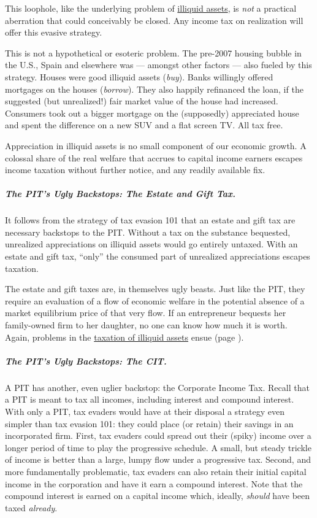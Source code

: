 This loophole, like the underlying problem of \hyperref[sec:TaxIlliquid]{illiquid assets}, is \emph{not} a practical aberration that could conceivably be closed. Any income tax on realization will offer this evasive strategy. 

This is not a hypothetical or esoteric problem. The pre-2007 housing bubble in the U.S., Spain and elsewhere was --- amongst other factors --- also fueled by this strategy. Houses were good illiquid assets (\emph{buy}). Banks willingly offered mortgages on the houses (\emph{borrow}). They also happily refinanced the loan, if the suggested (but unrealized!) fair market value of the house had increased. Consumers took out a bigger mortgage on the (supposedly) appreciated house and spent the difference on a new SUV and a flat screen TV. All tax free.

Appreciation in illiquid assets is no small component of our economic growth. A colossal share of the real welfare that accrues to capital income earners escapes income taxation without further notice, and any readily available fix.

\subparagraph{The PIT's Ugly Backstops: The Estate and Gift Tax.} It follows from the strategy of tax evasion 101 that an estate and gift tax are necessary backstops to the PIT. Without a tax on the substance bequested, unrealized appreciations on illiquid assets would go entirely untaxed. With an estate and gift tax, ``only'' the consumed part of unrealized appreciations escapes taxation.

The estate and gift taxes are, in themselves ugly beasts. Just like the PIT, they require an evaluation of a flow of economic welfare in the potential absence of a market equilibrium price of that very flow. If an entrepreneur bequests her family-owned firm to her daughter, no one can know how much it is worth. Again, problems in the \hyperref[sec:Illiquid]{taxation of illiquid assets} ensue (page \pageref{sec:Illiquid}). 

\subparagraph{The PIT's Ugly Backstops: The CIT.}  \label{sec:ScoreCIT} A PIT has another, even uglier backstop: the Corporate Income Tax. Recall that a PIT is meant to tax all incomes, including interest and compound interest. With only a PIT, tax evaders would have at their disposal a strategy even simpler than tax evasion 101: they could place (or retain) their savings in an incorporated firm. First, tax evaders could spread out their (spiky) income over a longer period of time to play the progressive schedule. A small, but steady trickle of income is better than a large, lumpy flow under a progressive tax. Second, and more fundamentally problematic, tax evaders can also retain their initial capital income in the corporation and have it earn a compound interest. Note that the compound interest is earned on a capital income which, ideally, \emph{should} have been taxed \emph{already}.


